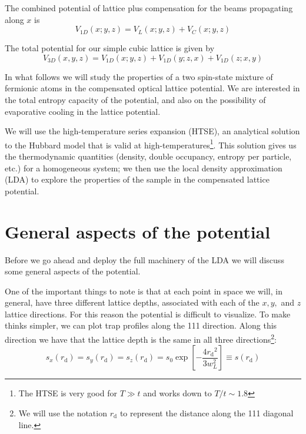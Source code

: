 \documentclass[11pt,letter]{article}
\newcommand{\rdiag}{\ensuremath{ r_{\text{d}} } }
\begin{document}
The combined potential of lattice plus compensation for the beams propagating
along $x$ is 
\begin{equation}
  V_{1D}( x; y ,z ) = V_{L}(x; y,z) + V_{C}(x; y, z)
\end{equation}

The total potential for our simple cubic lattice is given by 
\begin{equation}
  V_{3D}(x, y, z)  =  V_{1D}( x; y,z) + V_{1D}( y; z,x) + V_{1D}(z; x,y)
\end{equation}


In what follows we will study the properties of a two spin-state mixture of
fermionic atoms in the compensated optical lattice potential.   We are
interested in the total entropy capacity of the potential, and also on the
possibility of evaporative cooling in the lattice potential.   

We will use the high-temperature series expansion (HTSE),  an analytical
solution to the Hubbard model that is valid at high-temperatures\footnote{ The
HTSE is very good for $T \gg t$ and works down to $T/t \sim 1.8$ }.  This
solution gives us the thermodynamic quantities (density, double occupancy,
entropy per particle, etc.)  for a homogeneous system;  we then use the local
density approximation (LDA) to explore the properties of the sample in the
compensated lattice potential.  

\section{General aspects of the potential }

Before we go ahead and deploy the full machinery of the LDA we will discuss
some general aspects of the potential. 

One of the important things to note is that at each point in space  we will, in
general, have three different lattice depths, associated with each of the
$x,y,$ and $z$ lattice directions.  For this reason the potential is difficult
to visualize.  To make thinks simpler, we can plot trap profiles along the 111
direction.   Along this direction we have that the lattice depth is the same in
all three directions\footnote{We will use the notation $\rdiag$ to represent
the distance along the 111 diagonal line.}:
\begin{equation} 
  s_{x}( \rdiag ) = s_{y}( \rdiag ) = s_{z}( \rdiag ) = 
  s_{0} \exp \left[ - \frac{ 4 \rdiag^{2} }{3 w_{L}^{2} } \right]  
  \equiv s(\rdiag) 
\end{equation}
\end{document}
